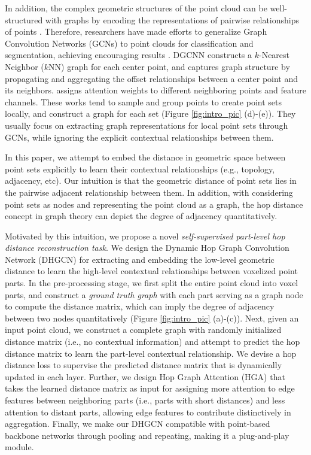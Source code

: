 \documentclass[letterpaper]{article} %
\begin{document}
In addition, the complex geometric structures of the point cloud can be well-structured with graphs by encoding the representations of pairwise relationships of points  \cite{defferrard2016convolutional,chung1997spectral}.
Therefore, researchers have made efforts to generalize Graph Convolution Networks (GCNs) to point clouds for classification and segmentation, achieving encouraging results  \cite{qi20173d,landrieu2018large,bi2019graph,yi2023graph}.
DGCNN \cite{dgcnn} constructs a \(k\)-Nearest Neighbor (\(k\)NN) graph for each center point, and
captures graph structure by propagating and aggregating the offset relationships between a center point and its neighbors.
\citet{wang2019graphattenconv} assigns attention weights to different neighboring points and feature channels.
These works tend to sample and group points to create point sets locally, and construct a graph for each set (Figure \ref{fig:intro_pic} (d)-(e)).
They usually focus on extracting graph representations for local point sets through GCNs, while ignoring the explicit contextual relationships between them.


In this paper, we attempt to embed the distance in geometric space between point sets explicitly to learn their contextual relationships (e.g., topology, adjacency, etc).
Our intuition is that the geometric distance of point sets lies in the pairwise adjacent relationship between them.
In addition, with considering point sets as nodes and representing the point cloud as a graph, the hop distance concept in graph theory can depict
the degree of adjacency quantitatively.


Motivated by this intuition, we propose a novel \textit{self-supervised part-level hop distance reconstruction task}.
We design the Dynamic Hop Graph Convolution Network (DHGCN) for extracting and embedding the low-level geometric distance to learn the high-level contextual relationships between voxelized point parts.
In the pre-processing stage, we first split the entire point cloud into voxel parts, and construct a \textit{ground truth graph} with each part serving as a graph node to compute the distance matrix, which can imply the degree of adjacency between two nodes quantitatively (Figure \ref{fig:intro_pic} (a)-(c)).
Next, given an input point cloud, we construct a complete graph with randomly initialized distance matrix (i.e., no contextual information)
and attempt to predict the hop distance matrix to learn the part-level contextual relationship.
We devise a hop distance loss to supervise the predicted distance matrix that is dynamically updated in each layer.
Further, we design Hop Graph Attention (HGA) that takes the learned distance matrix as input for assigning more attention to edge features between neighboring parts (i.e., parts with short distances) and less attention to distant parts,  allowing edge features to contribute distinctively in aggregation.
Finally, we make our DHGCN compatible with point-based backbone networks through pooling and repeating, making it a plug-and-play module.
\end{document}
